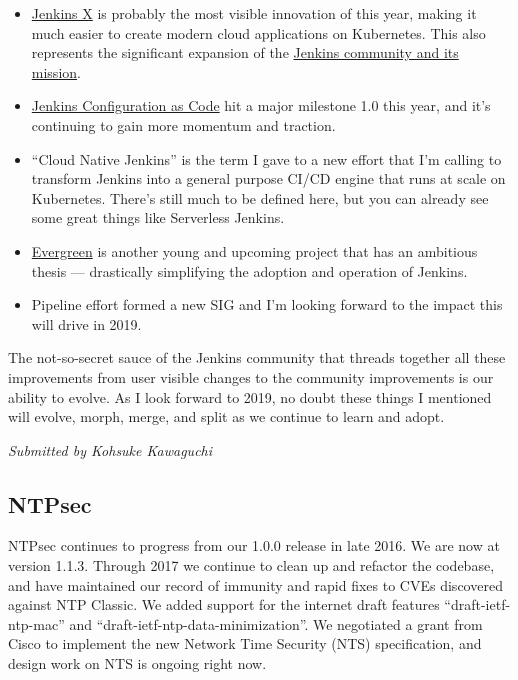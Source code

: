\documentclass[a4paper]{report}
\begin{document}
\begin{itemize}

\item \href{https://jenkins-x.io/}{Jenkins X} is probably the most
visible innovation of this year, making it much easier to create modern
cloud applications on Kubernetes. This also represents the significant
expansion of the
\href{https://jenkins.io/blog/2018/03/20/evolving-mission-of-jenkins/}{Jenkins
community and its mission}.

\item \href{https://jenkins.io/projects/jcasc/}{Jenkins Configuration as
Code} hit a major milestone 1.0 this year, and it's continuing to gain
more momentum and traction.

\item ``Cloud Native Jenkins'' is the term I gave to a new effort that
I'm calling to transform Jenkins into a general purpose CI/CD engine that
runs at scale on Kubernetes. There's still much to be defined here, but
you can already see some great things like Serverless Jenkins.

\item \href{https://jenkins.io/projects/evergreen/}{Evergreen} is another
young and upcoming project that has an ambitious thesis --- drastically
simplifying the adoption and operation of Jenkins.

\item Pipeline effort formed a new SIG and I'm looking forward to the
impact this will drive in 2019.

\end{itemize}

The not-so-secret sauce of the Jenkins community that threads together
all these improvements from user visible changes to the community
improvements is our ability to evolve. As I look forward to 2019, no
doubt these things I mentioned will evolve, morph, merge, and split as
we continue to learn and adopt.

{\em Submitted by Kohsuke Kawaguchi}

\subsection{NTPsec}

NTPsec continues to progress from our 1.0.0 release in late 2016.  We
are now at version 1.1.3.  Through 2017 we continue to clean up and
refactor the codebase, and have maintained our record of immunity and
rapid fixes to CVEs discovered against NTP Classic.  We added support
for the internet draft features ``draft-ietf-ntp-mac'' and
``draft-ietf-ntp-data-minimization''.  We negotiated a grant from Cisco
to implement the new Network Time Security (NTS) specification, and
design work on NTS is ongoing right now.
\end{document}
